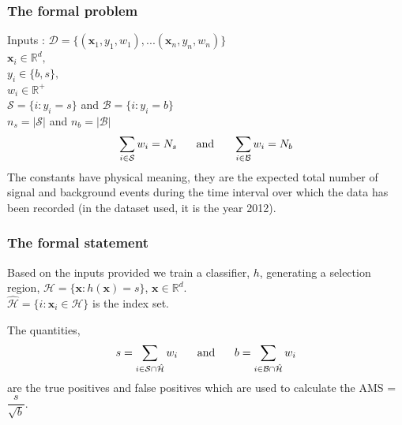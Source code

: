 \documentclass[pdf]{beamer}
\begin{document}
\begin{frame}
\frametitle{The formal problem}

Inputs : $\mathcal{D} = \{(\mathbf{x}_{1},y_{1},w_{1}),...(\mathbf{x}_{n},y_{n},w_{n}) \}$\\
$\mathbf{x}_{i} \in \mathbb{R}^d,$\\
$y_{i} \in \{b,s\},$\\
$w_{i} \in \mathbb{R}^{+}$ \\
$\mathcal{S} = \{i : y_{i} = s\}$ and $\mathcal{B} = \{i : y_{i} = b\}$\\
$n_{s} = |\mathcal{S}|$ and $n_{b} = |\mathcal{B}|$ 
\begin{equation}
\sum_{i \in \mathcal{S}} w_{i} = N_{s} \hspace{5mm} 
\textrm{ and } \hspace{5mm} 
\sum_{i \in \mathcal{B}} w_{i} = N_{b} 
\end{equation}
The constants have physical meaning, they are the expected total number of signal and background events during the time interval over which the data has been recorded (in the dataset used, it is the year 2012).
\end{frame}

\begin{frame}
\frametitle{The formal statement}
Based on the inputs provided we train a classifier, $h$, generating a selection region, 
$\mathcal{H} = \{\textbf{x} : h(\textbf{x}) = s\}$, $\textbf{x} \in \mathbb{R}^{d}$.\\
$ \hat{\mathcal{H}} = \{i : \textbf{x}_{i} \in \mathcal{H}\}$ is the index set. 

The quantities, 
\begin{equation} 
s = \sum_{i \in \mathcal{S}\cap \hat{\mathcal{H}}} w_{i} \hspace{5mm}
\textrm{    and    } \hspace{5mm}
b =\sum_{i \in \mathcal{B}\cap\hat{\mathcal{H}}} w_{i} 
\end{equation} 
are the true positives and false positives which are used to calculate the AMS = $\dfrac{s}{\sqrt{b}}.$
\end{frame}
\end{document}
